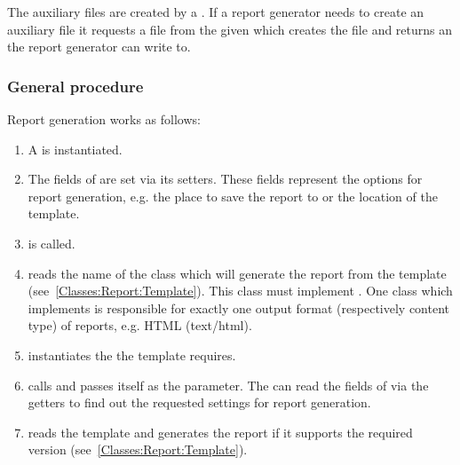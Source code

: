 The auxiliary files are created by a . If a report generator needs to create an auxiliary file it requests a file from the given  which creates the file and returns an  the report generator can write to.


\subsubsection{General procedure} %

Report generation works as follows:
\begin{enumerate}
\item A  is instantiated.

\item The fields of  are set via its setters. These fields represent the options for report generation, e.g. the place to save the report to or the location of the template.

\item {} is called. 

\item {} reads the name of the class which will generate the report from the template (see~\ref{Classes:Report:Template}). This class must implement . One class which implements  is responsible for exactly one output format (respectively content type) of reports, e.g. HTML (text/html).

\item {} instantiates the  the template requires.

\item {} calls  and passes itself as the parameter. The  can read the fields of  via the getters to find out the requested settings for report generation.

\item {} reads the template and generates the report if it supports the required version (see~\ref{Classes:Report:Template}).

\end{enumerate}


\subsubsection{} \label{Classes:Report:Report}

